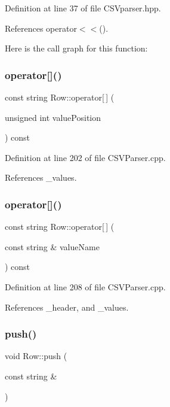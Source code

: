 Definition at line 37 of file C\+S\+Vparser.\+hpp.



References operator$<$$<$().

Here is the call graph for this function\+:
\mbox{\label{class_row_ab52c9571957f0278f13bb5bcc21dccda}} 
\subsubsection{operator[]()\hspace{0.1cm}{\footnotesize\ttfamily [1/2]}}
{\footnotesize\ttfamily const string Row\+::operator[$\,$] (\begin{DoxyParamCaption}\item[{unsigned int}]{value\+Position }\end{DoxyParamCaption}) const}



Definition at line 202 of file C\+S\+V\+Parser.\+cpp.



References \+\_\+values.

\mbox{\label{class_row_a42f23dd69d591da253b7428647f16ff8}} 
\subsubsection{operator[]()\hspace{0.1cm}{\footnotesize\ttfamily [2/2]}}
{\footnotesize\ttfamily const string Row\+::operator[$\,$] (\begin{DoxyParamCaption}\item[{const string \&}]{value\+Name }\end{DoxyParamCaption}) const}



Definition at line 208 of file C\+S\+V\+Parser.\+cpp.



References \+\_\+header, and \+\_\+values.

\mbox{\label{class_row_a1d205d3f3f1e1a11a36f5bacae6632db}} 
\subsubsection{push()}
{\footnotesize\ttfamily void Row\+::push (\begin{DoxyParamCaption}\item[{const string \&}]{ }\end{DoxyParamCaption})}



